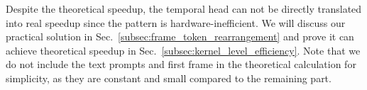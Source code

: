 Despite the theoretical speedup, the temporal head can not be directly translated into real speedup since the pattern is hardware-inefficient. We will discuss our practical solution in Sec.~\ref{subsec:frame_token_rearrangement} and prove it can achieve theoretical speedup in Sec.~\ref{subsec:kernel_level_efficiency}. Note that we do not include the text prompts and first frame in the theoretical calculation for simplicity, as they are constant and small compared to the remaining part.





